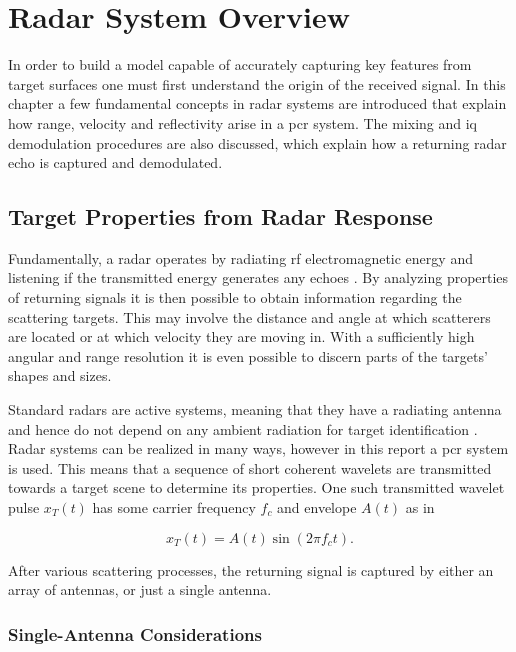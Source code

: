 \chapter{Radar System Overview}

In order to build a model capable of accurately capturing key features from target surfaces one must first understand the origin of the received signal. In this chapter a few fundamental concepts in radar systems are introduced that explain how range, velocity and reflectivity arise in a \gls{pcr} system. The mixing and \gls{iq} demodulation procedures are also discussed, which explain how a returning radar echo is captured and demodulated. 

\section{Target Properties from Radar Response}
Fundamentally, a radar operates by radiating \gls{rf} electromagnetic energy and listening if the transmitted energy generates any echoes \citep{skolnik_2009}. By analyzing properties of returning signals it is then possible to obtain information regarding the scattering targets. This may involve the distance and angle at which scatterers are located or at which velocity they are moving in. With a sufficiently high angular and range resolution it is even possible to discern parts of the targets' shapes and sizes.  

Standard radars are active systems, meaning that they have a radiating antenna and hence do not depend on any ambient radiation for target identification \citep{richards_2014}. Radar systems can be realized in many ways, however in this report a \gls{pcr} system is used. This means that a sequence of short coherent wavelets are transmitted towards a target scene to determine its properties. One such transmitted wavelet pulse $x_T(t)$ has some carrier frequency $f_c$ and envelope $A(t)$ as in

\begin{equation}\label{eq:trans}
	x_T(t)
	= A(t)\sin(2\pi f_c t).
\end{equation}

After various scattering processes, the returning signal is captured by either an array of antennas, or just a single antenna.

\subsection{Single-Antenna Considerations}

